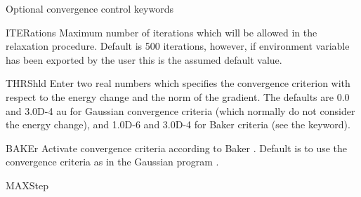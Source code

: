 Optional convergence control keywords
\begin{keywordlist}
\item[ITERations]
Maximum number of iterations which
will be allowed in the relaxation procedure. Default is 500
iterations, however, if environment variable  has been exported by the user
this is the assumed default value.
\item[THRShld]
Enter two real numbers which specifies the convergence criterion with respect to the
energy change and the norm of the gradient. The defaults are
0.0 and 3.0D-{}4 au for Gaussian convergence criteria
(which normally do not consider the energy change), and
1.0D-{}6 and 3.0D-{}4 for Baker criteria (see the  keyword).
\item[BAKEr]
Activate convergence criteria according to Baker \cite{Baker}.
Default is to use the convergence criteria as in the Gaussian
program \cite{GAUSSIAN94}.
\item[MAXStep]

\end{keywordlist}
